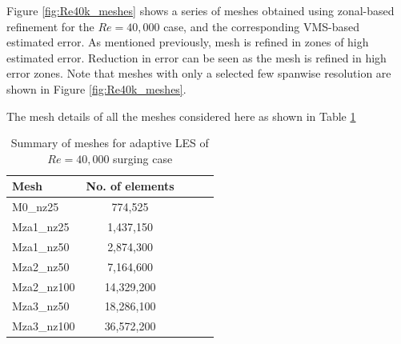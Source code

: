 Figure \ref{fig:Re40k_meshes} shows a series of meshes obtained using zonal-based refinement for the $Re=40,000$ case, and the corresponding VMS-based estimated error. As mentioned previously, mesh is refined in zones of high estimated error. 
Reduction in error can be seen as the mesh is refined in high error zones.
Note that meshes with only a selected few spanwise resolution are shown in Figure \ref{fig:Re40k_meshes}.

The mesh details of all the meshes considered here as shown in Table \ref{table:adapt_mesh_details_Re40k}

\begin{table}[H]
	\centering
	\caption{Summary of meshes for adaptive LES of $Re=40,000$ surging case}
	\label{table:adapt_mesh_details_Re40k}
	\begin{tabular}{|l|c|c|c|c|}
		\hline
		Mesh   & No. of elements \\
		\hline
		M0\_nz25	& 774,525 \\
		\hline
		Mza1\_nz25	& 1,437,150 \\
		\hline		
		Mza1\_nz50 &  2,874,300 \\
		\hline
		Mza2\_nz50  &  7,164,600 \\
		\hline
		Mza2\_nz100  &  14,329,200 \\
		\hline
		Mza3\_nz50  &  18,286,100 \\
		\hline
		Mza3\_nz100  &  36,572,200 \\
		\hline
	\end{tabular}
\end{table}

